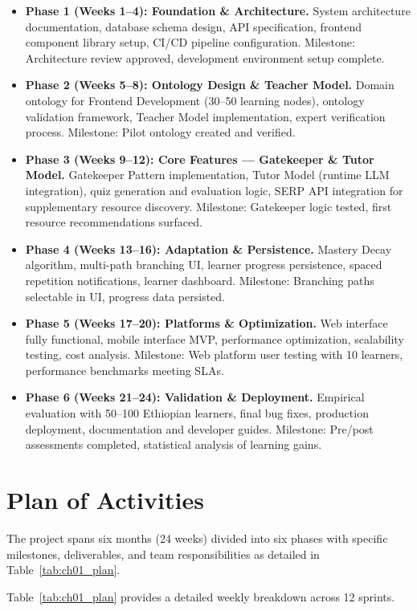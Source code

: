 \begin{itemize}
    \item \textbf{Phase 1 (Weeks 1--4): Foundation \& Architecture.} System architecture documentation, database schema design, API specification, frontend component library setup, CI/CD pipeline configuration. Milestone: Architecture review approved, development environment setup complete.
    \item \textbf{Phase 2 (Weeks 5--8): Ontology Design \& Teacher Model.} Domain ontology for Frontend Development (30--50 learning nodes), ontology validation framework, Teacher Model implementation, expert verification process. Milestone: Pilot ontology created and verified.
    \item \textbf{Phase 3 (Weeks 9--12): Core Features --- Gatekeeper \& Tutor Model.} Gatekeeper Pattern implementation, Tutor Model (runtime LLM integration), quiz generation and evaluation logic, SERP API integration for supplementary resource discovery. Milestone: Gatekeeper logic tested, first resource recommendations surfaced.
    \item \textbf{Phase 4 (Weeks 13--16): Adaptation \& Persistence.} Mastery Decay algorithm, multi-path branching UI, learner progress persistence, spaced repetition notifications, learner dashboard. Milestone: Branching paths selectable in UI, progress data persisted.
    \item \textbf{Phase 5 (Weeks 17--20): Platforms \& Optimization.} Web interface fully functional, mobile interface MVP, performance optimization, scalability testing, cost analysis. Milestone: Web platform user testing with 10 learners, performance benchmarks meeting SLAs.
    \item \textbf{Phase 6 (Weeks 21--24): Validation \& Deployment.} Empirical evaluation with 50--100 Ethiopian learners, final bug fixes, production deployment, documentation and developer guides. Milestone: Pre/post assessments completed, statistical analysis of learning gains.
\end{itemize}

\section{Plan of Activities}
\label{sec:plan}

The project spans six months (24 weeks) divided into six phases with specific milestones, deliverables, and team responsibilities as detailed in Table~\ref{tab:ch01_plan}.

Table~\ref{tab:ch01_plan} provides a detailed weekly breakdown across 12 sprints.

